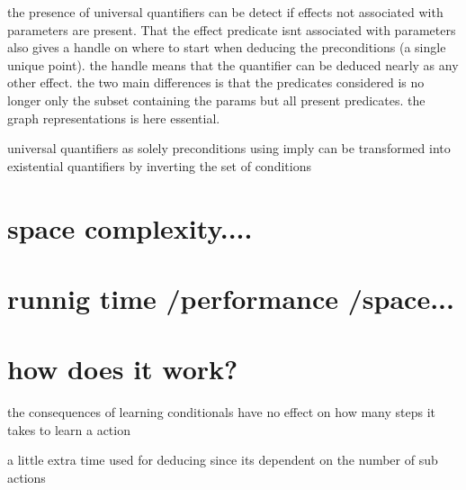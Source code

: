 	
	
	


	the presence of universal quantifiers can be detect if effects not associated with parameters are present. That the effect predicate isnt associated with parameters also gives a handle on where to start when deducing the preconditions (a single unique point). the handle means that the quantifier can be deduced nearly as any other effect. the two main differences is that the predicates considered is no longer only the subset containing the params but all present predicates. the graph representations is here essential. 
	
	
	universal quantifiers as solely preconditions using imply can be transformed into existential quantifiers by inverting the set of conditions
\section{space complexity....}

	
\section{runnig time /performance /space...}
	
\section{how does it work?}	
	
	the consequences of learning conditionals have no effect on how many steps it takes to learn a action
	
	a little extra time used for deducing since its dependent on the number of sub actions
	
	
